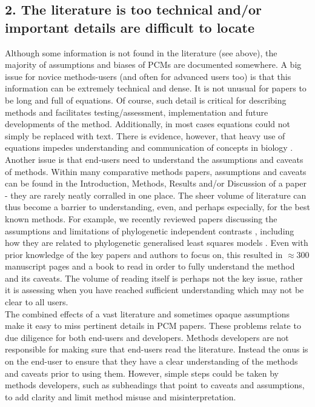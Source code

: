 \documentclass[a4paper,12pt]{article}
\begin{document}
  \subsection{2. The literature is too technical and/or important details are difficult to locate}
    Although some information is not found in the literature (see above), the majority of assumptions and biases of PCMs are documented somewhere. 
    A big issue for novice methods-users (and often for advanced users too) is that this information can be extremely technical and dense.
    It is not unusual for papers to be long and full of equations. 
    Of course, such detail is critical for describing methods and facilitates testing/assessment, implementation and future developments of the method.
    Additionally, in most cases equations could not simply be replaced with text.
    There is evidence, however, that heavy use of equations impedes understanding and communication of concepts in biology \citep{fawcett2012heavy}.\\
    
    Another issue is that end-users need to understand the assumptions and caveats of methods.
    Within many comparative methods papers, assumptions and caveats can be found in the Introduction, Methods, Results and/or Discussion of a paper - they are rarely neatly corralled in one place.
    The sheer volume of literature can thus become a barrier to understanding, even, and perhaps especially, for the best known methods.
    For example, we recently reviewed papers discussing the assumptions and limitations of phylogenetic independent contrasts \citep{felsenstein1985phylogenies}, including how they are related to phylogenetic generalised least squares models \citep{garland2000using,rohle2006comment,blomberg2012independent}. 
    Even with prior knowledge of the key papers and authors to focus on, this resulted in $\approx 300$ manuscript pages and a book to read in order to fully understand the method and its caveats.
    The volume of reading itself is perhaps not the key issue, rather it is assessing when you have reached sufficient understanding which may not be clear to all users.\\

    The combined effects of a vast literature and sometimes opaque assumptions make it easy to miss pertinent details in PCM papers.
    These problems relate to due diligence for both end-users and developers. 
    Methods developers are not responsible for making sure that end-users read the literature. 
    Instead the onus is on the end-user to ensure that they have a clear understanding of the methods and caveats prior to using them. 
    However, simple steps could be taken by methods developers, such as subheadings that point to caveats and assumptions, to add clarity and limit method misuse and misinterpretation. 
\end{document}
